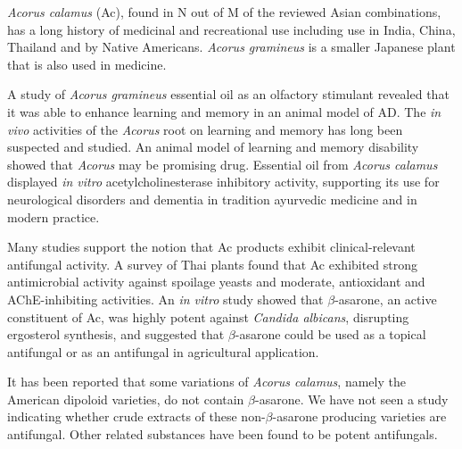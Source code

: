 \documentclass[twocolumn]{article}
\begin{document}
\textit{Acorus calamus} (Ac),
found in N out of M of the reviewed Asian combinations,
has a long history of medicinal and recreational use
including use in India, China, Thailand and by Native Americans.
\cite{phongpaichit2005antimicrobial}
\textit{Acorus gramineus} is a smaller Japanese plant
that is also used in medicine.

A study of \textit{Acorus gramineus}
essential oil as an olfactory stimulant revealed that it was
able to enhance learning and memory in an animal model of AD.
\cite{liu2010study}
The \textit{in vivo} activities of the
\textit{Acorus} root on learning and memory
has long been suspected and studied.
An animal model of learning and memory disability
showed that \textit{Acorus} may be promising drug.
\cite{wenling1993facilitatory}
Essential oil from \textit{Acorus calamus}
displayed \textit{in vitro}
acetylcholinesterase inhibitory activity,
supporting its use for neurological disorders
and dementia in tradition ayurvedic medicine
and in modern practice.
\cite{mukherjee2007vitro}


Many studies support the notion that Ac products exhibit clinical-relevant
antifungal activity.
A survey of Thai plants found that Ac
exhibited strong antimicrobial activity against spoilage yeasts
and moderate, antioxidant and AChE-inhibiting activities.
\cite{nanasombat2014antimicrobial}
An \textit{in vitro} study showed that $\beta$-asarone,
an active constituent of Ac,
was highly potent against \textit{Candida albicans},
disrupting ergosterol synthesis,
and suggested that $\beta$-asarone could be used as a topical
antifungal
\cite{rajput2013beta}
or as an antifungal in agricultural application.
\cite{lee2004antifungal}

It has been reported that some variations of \textit{Acorus calamus},
namely the American dipoloid varieties,
do not contain $\beta$-asarone.
\cite{phongpaichit2005antimicrobial}
We have not seen a study indicating whether crude extracts
of these non-$\beta$-asarone producing varieties are antifungal.
Other related substances have been found to be potent antifungals.
\cite{rajput2013anti}
\end{document}
